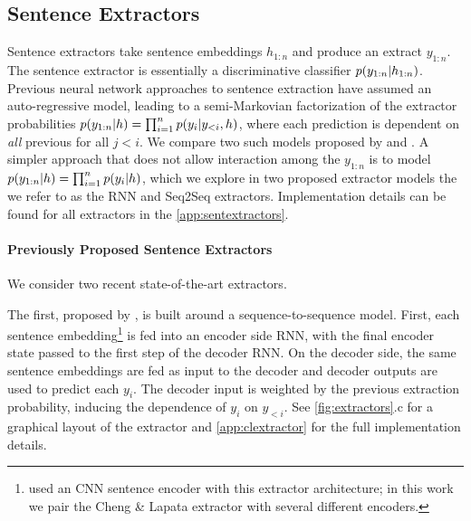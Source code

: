 \subsection{Sentence Extractors} \label{sec:sext}



Sentence extractors take sentence embeddings $h_{1:n}$ and produce an extract $y_{1:n}$.
The sentence extractor is essentially a discriminative 
classifier $p(\slabel_{1:n} | \sentEmb_{1:n})$.
Previous neural network approaches to sentence extraction have assumed 
an auto-regressive model, leading to a semi-Markovian
factorization of the extractor probabilities 
$p(\slabel_{1:n}|\sentEmb)=\prod_{i=1}^\docSize 
p(\slabel[i]|\slabel[<i],\sentEmb)$,
where each prediction \slabel[i] is dependent on \emph{all} 
previous \slabel[j] for
all $j < i$. We compare two such models proposed by \citet{cheng2016neural}
and \citet{nallapati2017summarunner}.
A simpler approach that does not allow interaction among the $y_{1:n}$
is to 
  model $p(\slabel_{1:n}|\sentEmb) = \prod_{i=1}^n p(y_i|h)$, 
  which we explore in two proposed extractor models the we refer to as the RNN 
  and Seq2Seq extractors.
Implementation details can be found for all extractors in the \autoref{app:sentextractors}.


\paragraph{Previously Proposed Sentence Extractors}
 We consider two recent state-of-the-art extractors.

 The first, proposed by 
\citet{cheng2016neural}, %
is built around a sequence-to-sequence model.
First, each sentence embedding\footnote{\citet{cheng2016neural} used an CNN sentence encoder with 
this extractor architecture; in this work we pair the Cheng \& Lapata extractor
with several different encoders.} is
fed into an encoder side RNN, with the final encoder state passed to the
first step of the decoder RNN. On the decoder side, the same sentence 
embeddings are fed as input to the decoder and decoder outputs are used to
predict each $y_i$. The decoder input is weighted by the previous extraction
probability, inducing the dependence of $y_i$ on $y_{<i}$.
See \autoref{fig:extractors}.c for a graphical layout of the extractor
and \autoref{app:clextractor} for the full implementation details.

